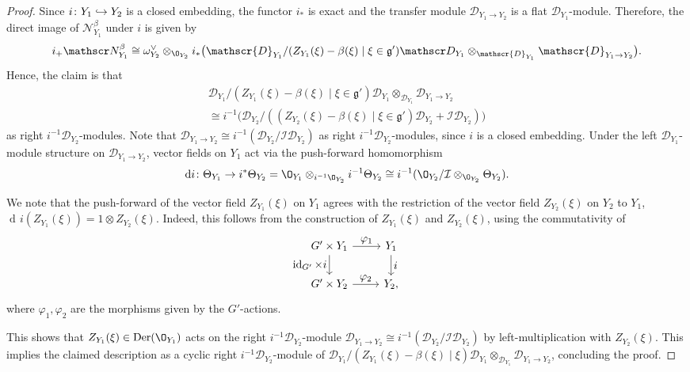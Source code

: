 \documentclass[JEP,XML,SOM,Unicode,published]{cedram}
\let\ts\textstyle
\newcommand\hto{\mathrel{\lhook\joinrel\to}}
\newcommand{\frg}{\mathfrak{g}}
\DeclareMathOperator{\Der}{\textup{Der}}
\DeclareMathOperator{\differential}{d\!}
\DeclareMathOperator{\id}{\textup{id}}
\begin{document}
\begin{proof}
Since $i \colon Y_1 \hto Y_2$ is a closed embedding, the functor $i_*$ is exact and the transfer module $\mathscr{D}_{Y_1 \to Y_2}$ is a flat $\mathscr{D}_{Y_1}$\nobreakdash-mod\-ule. Therefore, the direct image of $\mathscr N_{Y_1}^\beta$ under $i$ is given by
\[
i_+ \mathscr N_{Y_1}^\beta \cong \omega_{Y_2}^\vee \otimes_{\O_{Y_2}} i_*\big(\mathscr{D}_{Y_1}/(Z_{Y_1}(\xi)-\beta(\xi) \mid \xi \in \frg') \mathscr D_{Y_1} \otimes_{\mathscr{D}_{Y_1}} \mathscr{D}_{Y_1\to Y_2}\big).
\]
Hence, the claim is that
\begin{multline*}
\mathscr{D}_{Y_1}/(Z_{Y_1}(\xi)-\beta(\xi) \mid \xi \in \frg') \mathscr D_{Y_1} \otimes_{\mathscr{D}_{Y_1}} \mathscr{D}_{Y_1\to Y_2} \\
\cong i^{-1} \big(\mathscr{D}_{Y_2}/((Z_{Y_2}(\xi)-\beta(\xi)\mid \xi \in \frg') \mathscr{D}_{Y_2} + \mathcal I \mathscr{D}_{Y_2}) \big)
\end{multline*}
as right $i^{-1}\mathscr{D}_{Y_2}$\nobreakdash-mod\-ules.
Note that $\mathscr{D}_{Y_1\to Y_2} \cong i^{-1}(\mathscr{D}_{Y_2}/\mathcal I \mathscr{D}_{Y_2})$ as right $i^{-1} \mathscr{D}_{Y_2}$\nobreakdash-mod\-ules, since $i$ is a closed embedding. Under the left $\mathscr{D}_{Y_1}$\nobreakdash-mod\-ule structure on $\mathscr{D}_{Y_1\to Y_2}$, vector fields on $Y_1$ act via the push-forward homomorphism
\[
\differential i \colon \Theta_{Y_1} \to i^* \Theta_{Y_2} = \O_{Y_1} \otimes_{i^{-1} \O_{Y_2}} i^{-1} \Theta_{Y_2} \cong i^{-1}(\O_{Y_2}/\mathcal{I} \otimes_{\O_{Y_2}} \Theta_{Y_2}).
\]

We note that the push-forward of the vector field $Z_{Y_1}(\xi)$ on $Y_1$ agrees with the restriction of the vector field $Z_{Y_2}(\xi)$ on $Y_2$ to $Y_1$, \ie $\differential i(Z_{Y_1}(\xi)) = 1 \otimes Z_{Y_2}(\xi)$. Indeed, this follows from the construction of $Z_{Y_1}(\xi)$ and $Z_{Y_2}(\xi)$, using the commutativity of
\[
\begin{tikzcd}
G' \times Y_1 \ar{r}{\ts \varphi_1} \ar[swap]{d}{\ts \id_{G'} \times i} & Y_1 \ar{d}{\ts i} \\
G' \times Y_2 \ar{r}{\ts \varphi_2} & Y_2,
\end{tikzcd}
\]
where $\varphi_1, \varphi_2$ are the morphisms given by the $G'$-actions.

This shows that $Z_{Y_1}(\xi) \in \Der(\O_{Y_1})$ acts on the right $i^{-1} \mathscr D_{Y_2}$\nobreakdash-mod\-ule $\mathscr D_{Y_1 \to Y_2} \cong i^{-1}(\mathscr D_{Y_2}/\mathcal I \mathscr{D}_{Y_2})$ by left-multiplication with $Z_{Y_2}(\xi)$. This implies the claimed description as a cyclic right $i^{-1} \mathscr{D}_{Y_2}$\nobreakdash-mod\-ule of $\mathscr{D}_{Y_1}/(Z_{Y_1}(\xi)-\beta(\xi) \mid \xi) \mathscr D_{Y_1} \otimes_{\mathscr{D}_{Y_1}} \mathscr{D}_{Y_1\to Y_2}$, concluding the proof.
\end{proof}
\end{document}
